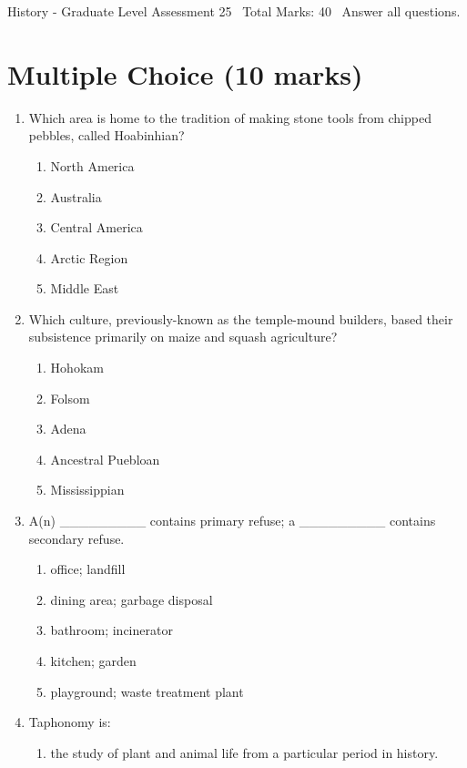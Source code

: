 \documentclass[12pt]{article}
\begin{document}
\begin{center}
History - Graduate Level Assessment 25 \
Total Marks: 40 \
Answer all questions.
\end{center}

\section*{Multiple Choice (10 marks)}
\begin{enumerate}[label=\arabic*.]
\item Which area is home to the tradition of making stone tools from chipped pebbles, called Hoabinhian?
\begin{enumerate}[label=(\alph*)]
    \item North America
    \item Australia
    \item Central America
    \item Arctic Region
    \item Middle East
\end{enumerate}
\item Which culture, previously-known as the temple-mound builders, based their subsistence primarily on maize and squash agriculture?
\begin{enumerate}[label=(\alph*)]
    \item Hohokam
    \item Folsom
    \item Adena
    \item Ancestral Puebloan
    \item Mississippian
\end{enumerate}
\item A(n) \_\_\_\_\_\_\_\_\_ contains primary refuse; a \_\_\_\_\_\_\_\_\_ contains secondary refuse.
\begin{enumerate}[label=(\alph*)]
    \item office; landfill
    \item dining area; garbage disposal
    \item bathroom; incinerator
    \item kitchen; garden
    \item playground; waste treatment plant
\end{enumerate}
\item Taphonomy is:
\begin{enumerate}[label=(\alph*)]
    \item the study of plant and animal life from a particular period in history.

\end{enumerate}
\end{enumerate}
\end{document}

